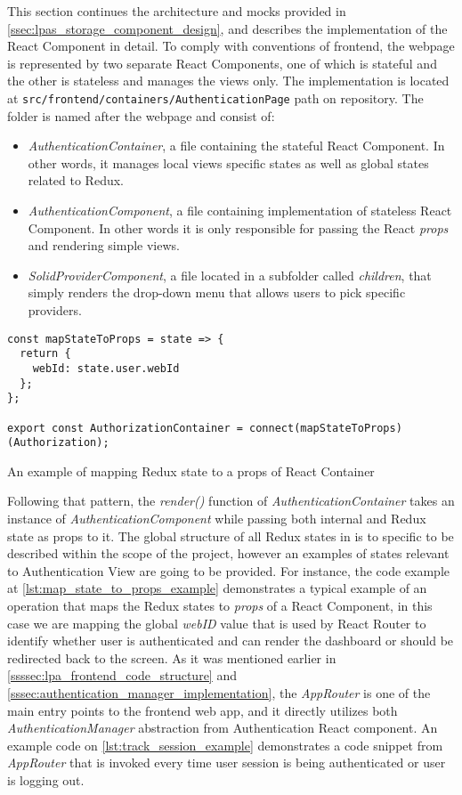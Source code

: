 This section continues the architecture and mocks provided in \autoref{ssec:lpas_storage_component_design}, and describes the implementation of the React Component in detail.
To comply with conventions of \lpa{} frontend, the webpage is represented by two separate React Components, one of which is stateful and the other is stateless and manages the views only. The implementation is located at \texttt{src/frontend/containers/AuthenticationPage} path on \lpa{} repository. The folder is named after the webpage and consist of:
\begin{itemize}
    \item \textit{AuthenticationContainer}, a file containing the stateful React Component. In other words, it manages local views specific states as well as global states related to Redux.
    \item \textit{AuthenticationComponent}, a file containing implementation of stateless React Component. In other words it is only responsible for passing the React \textit{props} and rendering simple views.
    \item \textit{SolidProviderComponent}, a file located in a subfolder called \textit{children}, that simply renders the drop-down menu that allows users to pick specific providers.
\end{itemize}

\begin{listing}[H]    
\begin{verbatim}
const mapStateToProps = state => {
  return {
    webId: state.user.webId
  };
};

export const AuthorizationContainer = connect(mapStateToProps)(Authorization);
\end{verbatim}
\caption{An example of mapping Redux state to a props of React Container} 
\label{lst:map_state_to_props_example}
\end{listing}

Following that pattern, the \textit{render()} function of \textit{AuthenticationContainer} takes an instance of \textit{AuthenticationComponent} while passing both internal and Redux state as props to it. The global structure of all Redux states in \lpa{} is to specific to be described within the scope of the \lpas{} project, however an examples of states relevant to Authentication View are going to be provided. For instance, the code example at \autoref{lst:map_state_to_props_example} demonstrates a typical example of an operation that maps the Redux states to \textit{props} of a React Component, in this case we are mapping the global \textit{webID} value that is used by React Router to identify whether user is authenticated and can render the dashboard or should be redirected back to the screen. As it was mentioned earlier in \autoref{ssssec:lpa_frontend_code_structure} and \autoref{sssec:authentication_manager_implementation}, the \textit{AppRouter} is one of the main entry points to the frontend web app, and it directly utilizes both \textit{AuthenticationManager} abstraction from Authentication React component. An example code on \autoref{lst:track_session_example} demonstrates a code snippet from \textit{AppRouter} that is invoked every time user session is being authenticated or user is logging out.

